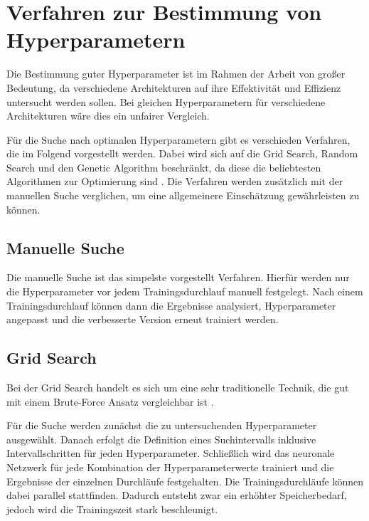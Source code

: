 \section{Verfahren zur Bestimmung von Hyperparametern}
\label{chapter:verfahren-bestimmung-hyperparameter}

Die Bestimmung guter Hyperparameter ist im Rahmen der Arbeit von großer Bedeutung, da verschiedene Architekturen auf ihre Effektivität und Effizienz untersucht werden sollen.
Bei gleichen Hyperparametern für verschiedene Architekturen wäre dies ein unfairer Vergleich.
\newline

Für die Suche nach optimalen Hyperparametern gibt es verschieden Verfahren, die im Folgend vorgestellt werden.
Dabei wird sich auf die Grid Search, Random Search und den Genetic Algorithm beschränkt, da diese die beliebtesten Algorithmen zur Optimierung sind \cite{hyperparameters-search-comparison-focus-genetic}.
Die Verfahren werden zusätzlich mit der manuellen Suche verglichen, um eine allgemeinere Einschätzung gewährleisten zu können.

\subsection{Manuelle Suche}
Die manuelle Suche ist das simpelste vorgestellt Verfahren.
Hierfür werden nur die Hyperparameter vor jedem Trainingsdurchlauf manuell festgelegt.
Nach einem Trainingsdurchlauf können dann die Ergebnisse analysiert, Hyperparameter angepasst und die verbesserte Version erneut trainiert werden.


\subsection{Grid Search}
Bei der Grid Search handelt es sich um eine sehr traditionelle Technik, die gut mit einem Brute-Force Ansatz vergleichbar ist \cite{hyperparameters-grid-search}.
\newline

Für die Suche werden zunächst die zu untersuchenden Hyperparameter ausgewählt.
Danach erfolgt die Definition eines Suchintervalls inklusive Intervallschritten für jeden Hyperparameter.
Schließlich wird das neuronale Netzwerk für jede Kombination der Hyperparameterwerte trainiert und die Ergebnisse der einzelnen Durchläufe festgehalten.
Die Trainingsdurchläufe können dabei parallel stattfinden.
Dadurch entsteht zwar ein erhöhter Speicherbedarf, jedoch wird die Trainingszeit stark beschleunigt.

